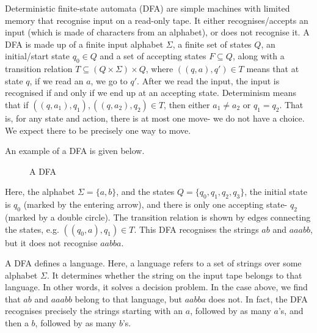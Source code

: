 \documentclass[a4paper, openany]{memoir}
\begin{document}
Deterministic finite-state automata (DFA) are simple machines with limited memory that recognise input on a read-only tape. It either recognises/accepts an input (which is made of characters from an alphabet), or does not recognise it. A DFA is made up of a finite input alphabet $\Sigma$, a finite set of states $Q$, an initial/start state $q_0 \in Q$ and a set of accepting states $F \subseteq Q$, along with a transition relation $T \subseteq (Q \times \Sigma) \times Q$, where $((q, a), q') \in T$ means that at state $q$, if we read an $a$, we go to $q'$. After we read the input, the input is recognised if and only if we end up at an accepting state. Determinism means that if $((q, a_1), q_1), ((q, a_2), q_2) \in T$, then either $a_1 \neq a_2$ or $q_1 = q_2$. That is, for any state and action, there is at most one move- we do not have a choice. We expect there to be precisely one way to move.

An example of a DFA is given below.
\begin{figure}[H]
    \centering
    \caption{A DFA}
\end{figure}
\noindent Here, the alphabet $\Sigma = \{a, b\}$, and the states $Q = \{q_0, q_1, q_2, q_3\}$, the initial state is $q_0$ (marked by the entering arrow), and there is only one accepting state- $q_2$ (marked by a double circle). The transition relation is shown by edges connecting the states, e.g. $((q_0, a), q_1) \in T$. This DFA recognises the strings $ab$ and $aaabb$, but it does not recognise $aabba$.

A DFA defines a language. Here, a language refers to a set of strings over some alphabet $\Sigma$. It determines whether the string on the input tape belongs to that language. In other words, it solves a decision problem. In the case above, we find that $ab$ and $aaabb$ belong to that language, but $aabba$ does not. In fact, the DFA recognises precisely the strings starting with an $a$, followed by as many $a$'s, and then a $b$, followed by as many $b$'s.
\end{document}

